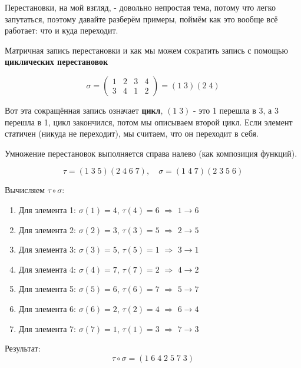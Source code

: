 \documentclass[12pt]{article}
\begin{document}
Перестановки, на мой взгляд, - довольно непростая тема, потому что легко запутаться, поэтому давайте разберём примеры, поймём как это вообще всё работает: что и куда переходит.\\

\begin{examplebox}
    Матричная запись перестановки и как мы можем сократить запись с помощью \textbf{циклических перестановок}

    \[
        \sigma = \begin{pmatrix}
        1 & 2 & 3 & 4 \\
        3 & 4 & 1 & 2
        \end{pmatrix}
         = (1\;3)(2\;4)
    \]

    Вот эта сокращённая запись означает \textbf{цикл}, $(1\;3)$ - это 1 перешла в 3, а 3 перешла в 1, цикл закончился, потом мы описываем второй цикл. Если элемент статичен (никуда не переходит), мы считаем, что он переходит в себя.
\end{examplebox}

\begin{examplebox}
    Умножение перестановок выполняется справа налево (как композиция функций).
    
    \[
        \tau = (1\;3\;5)(2\;4\;6\;7), \quad \sigma = (1\;4\;7)(2\;3\;5\;6)
    \]
    
    Вычисляем $\tau \circ \sigma$:
    \begin{enumerate}
        \item Для элемента 1: $\sigma(1)=4$, $\tau(4)=6$ $\Rightarrow$ $1\to6$
        \item Для элемента 2: $\sigma(2)=3$, $\tau(3)=5$ $\Rightarrow$ $2\to5$
        \item Для элемента 3: $\sigma(3)=5$, $\tau(5)=1$ $\Rightarrow$ $3\to1$
        \item Для элемента 4: $\sigma(4)=7$, $\tau(7)=2$ $\Rightarrow$ $4\to2$
        \item Для элемента 5: $\sigma(5)=6$, $\tau(6)=7$ $\Rightarrow$ $5\to7$
        \item Для элемента 6: $\sigma(6)=2$, $\tau(2)=4$ $\Rightarrow$ $6\to4$
        \item Для элемента 7: $\sigma(7)=1$, $\tau(1)=3$ $\Rightarrow$ $7\to3$
    \end{enumerate}
    
    Результат:
    \[
        \tau \circ \sigma = (1\;6\;4\;2\;5\;7\;3)
    \]
\end{examplebox}
\end{document}

